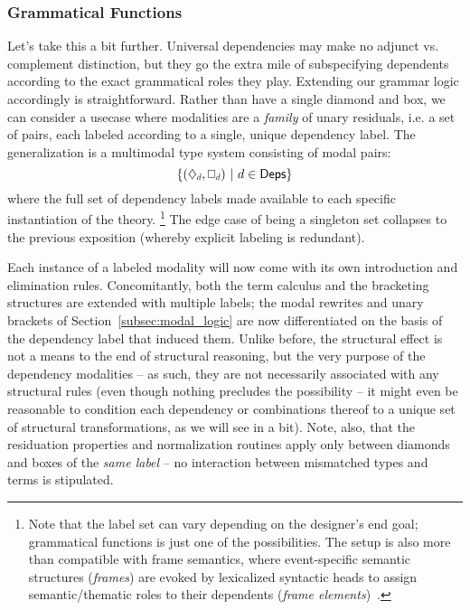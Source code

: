 \subsubsection{Grammatical Functions}
Let's take this a bit further.
Universal dependencies may make no adjunct vs. complement distinction, but they go the extra mile of subspecifying dependents according to the exact grammatical roles they play.
Extending our grammar logic accordingly is straightforward.
Rather than have a single diamond and box, we can consider a usecase where modalities are a \textit{family} of unary residuals, i.e. a set of pairs, each labeled according to a single, unique dependency label.
The generalization is a multimodal type system consisting of modal pairs:
\begin{equation}
\{(\ddia{d}, \dbox{d}) \ | \ {\dep{d} \in \deps} \} 
\end{equation}
where \deps{} the full set of dependency labels made available to each specific instantiation of the theory.%
\footnote{Note that the label set can vary depending on the designer's end goal; grammatical functions is just one of the possibilities.
	The setup is also more than compatible with frame semantics, where event-specific semantic structures (\textit{frames}) are evoked by lexicalized syntactic heads to assign semantic/thematic roles to their dependents (\textit{frame elements})~\cite{fillmore1976frame}.}%
The edge case of \deps{} being a singleton set collapses to the previous exposition (whereby explicit labeling is redundant).

Each instance of a labeled modality will now come with its own introduction and elimination rules.
Concomitantly, both the term calculus and the bracketing structures are extended with multiple labels; the modal rewrites and unary brackets of Section~\ref{subsec:modal_logic} are now differentiated on the basis of the dependency label that induced them.
Unlike before, the structural effect is not a means to the end of structural reasoning, but the very purpose of the dependency modalities -- as such, they are not necessarily associated with any structural rules (even though nothing precludes the possibility -- it might even be reasonable to condition each dependency or combinations thereof to a unique set of structural transformations, as we will see in a bit).
Note, also, that the residuation properties and normalization routines apply only between diamonds and boxes of the \textit{same label} -- no interaction between mismatched types and terms is stipulated.


